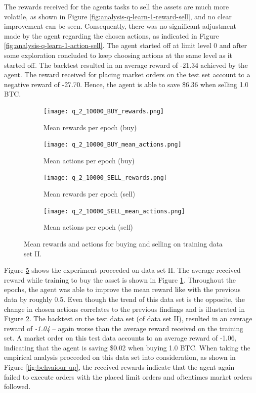 The rewards received for the agents tasks to sell the assets are much more volatile, as shown in Figure \ref{fig:analysis-q-learn-1-reward-sell}, and no clear improvement can be seen.
Consequently, there was no significant adjustment made by the agent regarding the chosen actions, as indicated in Figure \ref{fig:analysis-q-learn-1-action-sell}.
The agent started off at limit level 0 and after some exploration concluded to keep choosing actions at the same level as it started off.
The backtest resulted in an average reward of -21.34 achieved by the agent.
The reward received for placing market orders on the test set account to a negative reward of -27.70.
Hence, the agent is able to save \$6.36 when selling 1.0 BTC.

\begin{figure}[H]
    \centering
    \begin{subfigure}[b]{0.45\textwidth}
        \texttt{[image: q\_2\_10000\_BUY\_rewards.png]}
        \caption{Mean rewards per epoch (buy)}
        \label{fig:analysis-q-learn-2-reward-buy}
    \end{subfigure}
    \begin{subfigure}[b]{0.45\textwidth}
        \texttt{[image: q\_2\_10000\_BUY\_mean\_actions.png]}
        \caption{Mean actions per epoch (buy)}
        \label{fig:analysis-q-learn-2-action-buy}
    \end{subfigure}
    \begin{subfigure}[b]{0.45\textwidth}
        \texttt{[image: q\_2\_10000\_SELL\_rewards.png]}
        \caption{Mean rewards per epoch (sell)}
        \label{fig:analysis-q-learn-2-reward-sell}
    \end{subfigure}
    \begin{subfigure}[b]{0.45\textwidth}
        \texttt{[image: q\_2\_10000\_SELL\_mean\_actions.png]}
        \caption{Mean actions per epoch (sell)}
        \label{fig:analysis-q-learn-2-action-sell}
    \end{subfigure}
    \caption{Mean rewards and actions for buying and selling on training data set II.}
    \label{fig:analysis-q-learn-2}
\end{figure}

Figure \ref{fig:analysis-q-learn-2} shows the experiment proceeded on data set II.
The average received reward while training to buy the asset is shown in Figure \ref{fig:analysis-q-learn-2-reward-buy}.
Throughout the epochs, the agent was able to improve the mean reward like with the previous data by roughly 0.5.
Even though the trend of this data set is the opposite, the change in chosen actions correlates to the previous findings and is illustrated in Figure \ref{fig:analysis-q-learn-2-action-buy}.
The backtest on the test data set (of data set II), resulted in an average reward of \textit{-1.04} -- again worse than the average reward received on the training set.
A market order on this test data accounts to an average reward of -1.06, indicating that the agent is saving \$0.02 when buying 1.0 BTC.
When taking the empirical analysis proceeded on this data set into consideration, as shown in Figure \ref{fig:behvaiour-up}, the received rewards indicate that the agent again failed to execute orders with the placed limit orders and oftentimes market orders followed.

